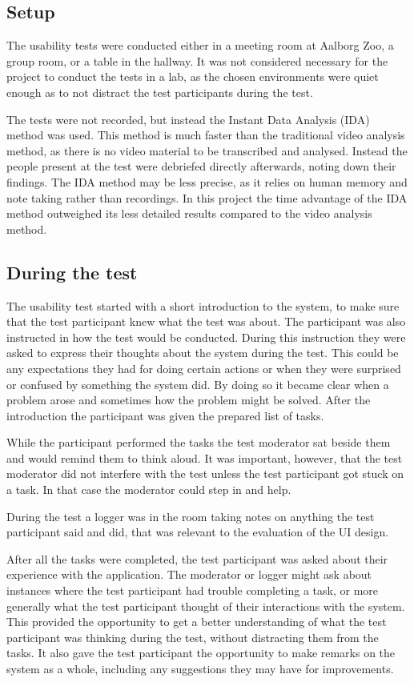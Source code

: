 \subsection{Setup}
The usability tests were conducted either in a meeting room at Aalborg Zoo, a group room, or a table in the hallway. It was not considered necessary for the project to conduct the tests in a lab, as the chosen environments were quiet enough as to not distract the test participants during the test.
\par
The tests were not recorded, but instead the Instant Data Analysis (IDA) method was used. This method is much faster than the traditional video analysis method, as there is no video material to be transcribed and analysed. Instead the people present at the test were debriefed directly afterwards, noting down their findings. The IDA method may be less precise, as it relies on human memory and note taking rather than recordings. In this project the time advantage of the IDA method outweighed its less detailed results compared to the video analysis method. \citep{IDA}

\subsection{During the test}
The usability test started with a short introduction to the system, to make sure that the test participant knew what the test was about. The participant was also instructed in how the test would be conducted. During this instruction they were asked to express their thoughts about the system during the test. This could be any expectations they had for doing certain actions or when they were surprised or confused by something the system did. By doing so it became clear when a problem arose and sometimes how the problem might be solved. After the introduction the participant was given the prepared list of tasks.
\par
While the participant performed the tasks the test moderator sat beside them and would remind them to think aloud. It was important, however, that the test moderator did not interfere with the test unless the test participant got stuck on a task. In that case the moderator could step in and help.
\par
During the test a logger was in the room taking notes on anything the test participant said and did, that was relevant to the evaluation of the UI design. 
\par
After all the tasks were completed, the test participant was asked about their experience with the application. The moderator or logger might ask about instances where the test participant had trouble completing a task, or more generally what the test participant thought of their interactions with the system. This provided the opportunity to get a better understanding of what the test participant was thinking during the test, without distracting them from the tasks. It also gave the test participant the opportunity to make remarks on the system as a whole, including any suggestions they may have for improvements.

